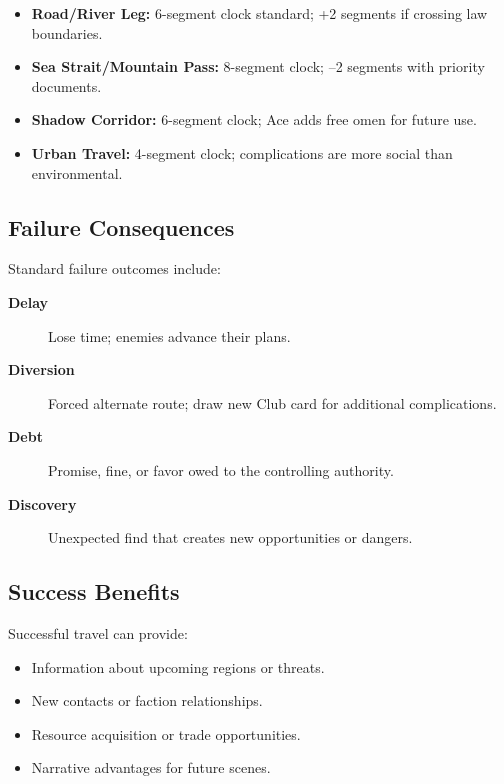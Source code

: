\begin{itemize}
\item \textbf{Road/River Leg:} 6-segment clock standard; +2 segments if crossing law boundaries.
\item \textbf{Sea Strait/Mountain Pass:} 8-segment clock; –2 segments with priority documents.
\item \textbf{Shadow Corridor:} 6-segment clock; Ace adds free omen for future use.
\item \textbf{Urban Travel:} 4-segment clock; complications are more social than environmental.
\end{itemize}

\subsection{Failure Consequences}
\label{subsec:failure-consequences}

Standard failure outcomes include:
\begin{description}
\item[\textbf{Delay}] Lose time; enemies advance their plans.
\item[\textbf{Diversion}] Forced alternate route; draw new Club card for additional complications.
\item[\textbf{Debt}] Promise, fine, or favor owed to the controlling authority.
\item[\textbf{Discovery}] Unexpected find that creates new opportunities or dangers.
\end{description}

\subsection{Success Benefits}
\label{subsec:success-benefits}

Successful travel can provide:
\begin{itemize}
\item Information about upcoming regions or threats.
\item New contacts or faction relationships.
\item Resource acquisition or trade opportunities.
\item Narrative advantages for future scenes.
\end{itemize}

